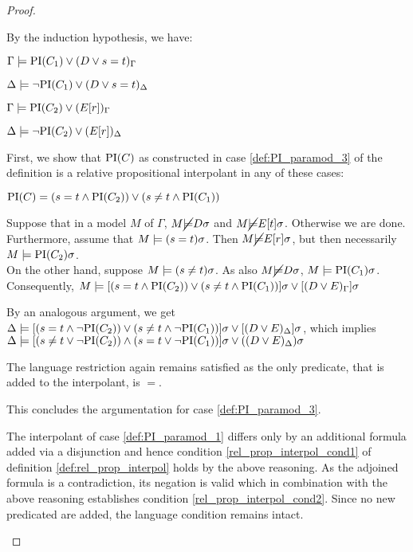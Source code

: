 \begin{proof}
\begin{itemize}
			By the induction hypothesis, we have:

			$\Gamma \models \mathrm{PI}(C_1) \lor (D\lor s=t)_\Gamma$

			$\Delta \models \lnot \mathrm{PI}(C_1) \lor (D\lor s=t)_\Delta$

			$\Gamma \models \mathrm{PI}(C_2) \lor (E[r])_\Gamma$

			$\Delta \models \lnot \mathrm{PI}(C_2) \lor (E[r])_\Delta$

			First, we show that $\mathrm{PI}(C)$ as constructed in case \ref{def:PI_paramod_3} of the definition is a relative propositional interpolant in any of these cases:

			$\mathrm{PI}(C) = (s=t \land \mathrm{PI}(C_2)) \lor (s\neq t \land \mathrm{PI}(C_1)) $
			
			Suppose that in a model $M$ of $\Gamma$, $M \cancel {\models} D\sigma$ and $M \cancel {\models} E[t]\sigma$. Otherwise we are done.
			Furthermore, assume that $M \models (s=t)\sigma$. Then $M \cancel {\models} E[r]\sigma$, but then necessarily $M \models \mathrm{PI}(C_2)\sigma$. \\
			On the other hand, suppose $M \models (s\neq t)\sigma$. As also $M \cancel {\models} D\sigma$, $M \models \mathrm{PI}(C_1)\sigma$.
			Consequently, $M \models [(s=t \land \mathrm{PI}(C_2)) \lor (s\neq t \land \mathrm{PI}(C_1))]\sigma \lor [(D \lor E)_\Gamma]\sigma$

			By an analogous argument, we get $\Delta \models [(s=t \land \lnot \mathrm{PI}(C_2)) \lor (s\neq t \land \lnot \mathrm{PI}(C_1))]\sigma \lor [(D \lor E)_\Delta]\sigma$,
			which implies
			$\Delta \models [( s\neq t \lor \lnot \mathrm{PI}(C_2)) \land (s = t \lor \lnot \mathrm{PI}(C_1))]\sigma \lor ((D \lor E)_\Delta)\sigma $


			The language restriction again remains satisfied as the only predicate, that is added to the interpolant, is $=$.

			This concludes the argumentation for case \ref{def:PI_paramod_3}. 

			The interpolant of case \ref{def:PI_paramod_1} differs only by an additional formula added via a disjunction and hence condition \ref{rel_prop_interpol_cond1} of definition \ref{def:rel_prop_interpol} holds by the above reasoning.
			As the adjoined formula is a contradiction, its negation is valid which in combination with the above reasoning establishes condition \ref{rel_prop_interpol_cond2}.
			Since no new predicated are added, the language condition remains intact. 


\end{itemize}
\end{proof}
